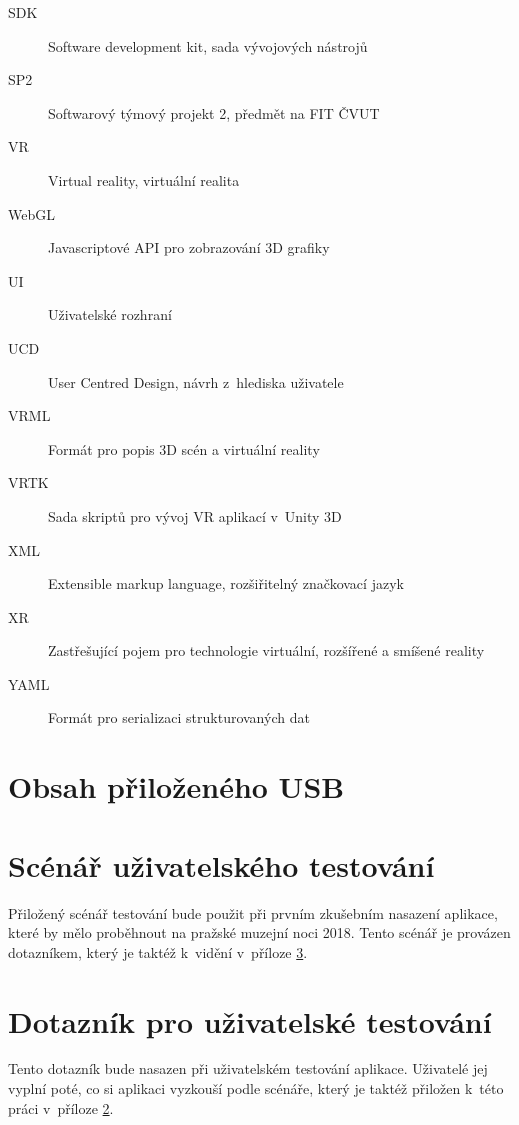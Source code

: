 \documentclass[thesis=B,czech]{FITthesis}[2012/06/26]
\begin{document}
\begin{description}
	\item[SDK] Software development kit, sada vývojových nástrojů 
	\item[SP2] Softwarový týmový projekt 2, předmět na FIT ČVUT
	\item[VR] Virtual reality, virtuální realita
    \item[WebGL] Javascriptové API pro zobrazování 3D grafiky
    \item[UI] Uživatelské rozhraní
    \item[UCD] User Centred Design, návrh z~hlediska uživatele
    \item[VRML] Formát pro popis 3D scén a virtuální reality
    \item[VRTK] Sada skriptů pro vývoj VR aplikací v~Unity 3D
	\item[XML] Extensible markup language, rozšiřitelný značkovací jazyk
	\item[XR] Zastřešující pojem pro technologie virtuální, rozšířené a smíšené reality
	\item[YAML] Formát pro serializaci strukturovaných dat
\end{description}


\chapter{Obsah přiloženého USB}


\begin{figure}
\end{figure}

\chapter{Scénář uživatelského testování} \label{sec:scenar}
Přiložený scénář testování bude použit při prvním zkušebním nasazení aplikace, které by mělo proběhnout na pražské muzejní noci 2018. Tento scénář je provázen dotazníkem, který je taktéž k~vidění v~příloze \ref{sec:dotaznik}.

\chapter{Dotazník pro uživatelské testování} \label{sec:dotaznik}
Tento dotazník bude nasazen při uživatelském testování aplikace. Uživatelé jej vyplní poté, co si aplikaci vyzkouší podle scénáře, který je taktéž přiložen k~této práci v~příloze \ref{sec:scenar}.


  
\end{document}
